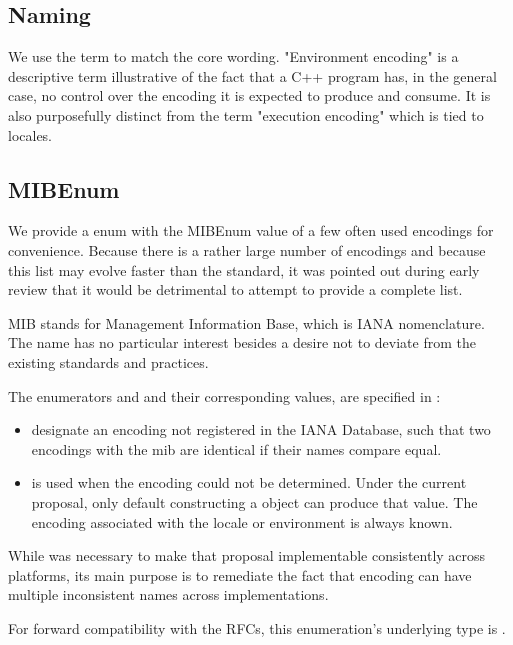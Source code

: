\documentclass{wg21}
\begin{document}
\subsection{Naming}

We use the term  to match the core wording.
"Environment encoding" is a descriptive term illustrative of the
fact that a C++ program has, in the general case, no control over the encoding it is expected to produce and consume. It is also purposefully
distinct from the term "execution encoding" which is tied to locales.

\subsection{MIBEnum}

We provide a  enum with the MIBEnum value of a few often used encodings for convenience.
Because there is a rather large number of encodings and because this list may evolve faster than the standard, it was pointed out during early review that it would be detrimental to attempt to provide a complete list.
\begin{note}
MIB stands for Management Information Base, which is IANA nomenclature. The name has no particular interest besides a desire not to deviate from the existing standards and practices.
\end{note}


The enumerators  and and their corresponding values, are specified in \cite{ianacharset-mib}:

\begin{itemize}
	\item {} designate an encoding not registered in the IANA Database, such that two encodings with the  mib are identical if their names compare equal.
	\item {} is used when the encoding could not be determined. Under the current proposal,  only default constructing a  object can produce that value. The encoding associated with the locale or environment is always known.
\end{itemize}

While  was necessary to make that proposal implementable consistently across platforms,
its main purpose is to remediate the fact that encoding can have multiple inconsistent names across implementations.

For forward compatibility with the RFCs, this enumeration's underlying type is .
\end{document}
